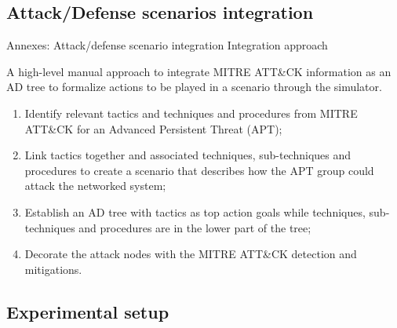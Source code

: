         \subsection{Attack/Defense scenarios integration}
	
        \begin{frame}{Annexes: Attack/defense scenario integration}
            {Integration approach}

            A high-level manual approach to integrate MITRE ATT\&CK information as an AD tree to formalize actions to be played in a scenario through the simulator.

            \begin{enumerate}
            
                \item Identify relevant tactics and techniques and procedures from MITRE ATT\&CK for an Advanced Persistent Threat (APT);
                
                \item Link tactics together and associated techniques, sub-techniques and procedures to create a scenario that describes how the APT group could attack the networked system;
            
                \item Establish an AD tree with tactics as top action goals while techniques, sub-techniques and procedures are in the lower part of the tree;
            
                \item Decorate the attack nodes with the MITRE ATT\&CK detection and mitigations.
                
            \end{enumerate}

        \end{frame}



        \subsection{Experimental setup}
        
